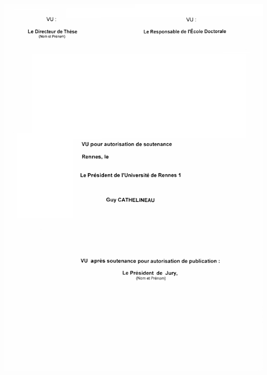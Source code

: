 \documentclass[a4paper, 12pt]{memoir}
\begin{document}
\renewcommand{\bibname}{Bibliographie générale}


\appendix

\newpage
\vspace*{-4cm}\begin{minipage}{1.5\linewidth}
  \hspace*{-3cm}\includegraphics[width=20.4cm]{LastPage}
\end{minipage}
\end{document}
